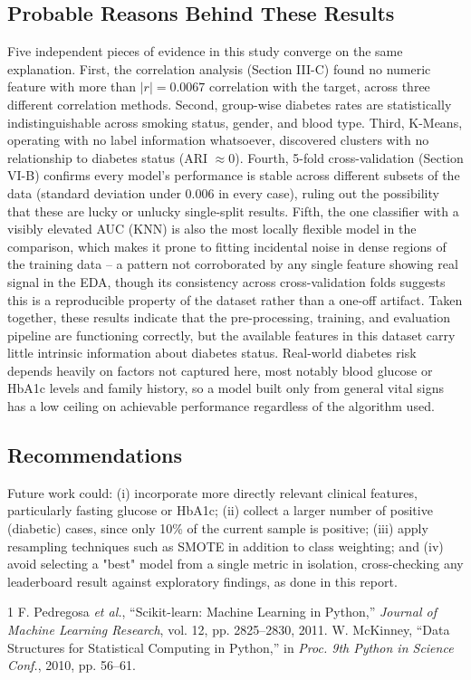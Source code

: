 \documentclass[journal]{IEEEtran}
\begin{document}
\subsection{Probable Reasons Behind These Results}
Five independent pieces of evidence in this study converge on the same explanation. First, the correlation analysis (Section III-C) found no numeric feature with more than $|r|=0.0067$ correlation with the target, across three different correlation methods. Second, group-wise diabetes rates are statistically indistinguishable across smoking status, gender, and blood type. Third, K-Means, operating with no label information whatsoever, discovered clusters with no relationship to diabetes status (ARI $\approx 0$). Fourth, 5-fold cross-validation (Section VI-B) confirms every model's performance is stable across different subsets of the data (standard deviation under 0.006 in every case), ruling out the possibility that these are lucky or unlucky single-split results. Fifth, the one classifier with a visibly elevated AUC (KNN) is also the most locally flexible model in the comparison, which makes it prone to fitting incidental noise in dense regions of the training data -- a pattern not corroborated by any single feature showing real signal in the EDA, though its consistency across cross-validation folds suggests this is a reproducible property of the dataset rather than a one-off artifact. Taken together, these results indicate that the pre-processing, training, and evaluation pipeline are functioning correctly, but the available features in this dataset carry little intrinsic information about diabetes status. Real-world diabetes risk depends heavily on factors not captured here, most notably blood glucose or HbA1c levels and family history, so a model built only from general vital signs has a low ceiling on achievable performance regardless of the algorithm used.

\subsection{Recommendations}
Future work could: (i) incorporate more directly relevant clinical features, particularly fasting glucose or HbA1c; (ii) collect a larger number of positive (diabetic) cases, since only 10\% of the current sample is positive; (iii) apply resampling techniques such as SMOTE in addition to class weighting; and (iv) avoid selecting a "best" model from a single metric in isolation, cross-checking any leaderboard result against exploratory findings, as done in this report.

\begin{thebibliography}{1}
 F. Pedregosa \emph{et al.}, ``Scikit-learn: Machine Learning in Python,'' \emph{Journal of Machine Learning Research}, vol. 12, pp. 2825--2830, 2011.
 W. McKinney, ``Data Structures for Statistical Computing in Python,'' in \emph{Proc. 9th Python in Science Conf.}, 2010, pp. 56--61.
\end{thebibliography}
\end{document}
